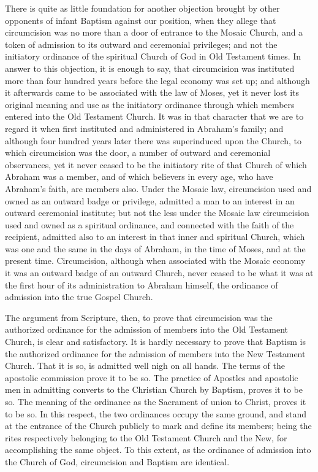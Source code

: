 \documentclass[]{book}
\begin{document}
There is quite as little foundation for another objection brought by other opponents of infant Baptism against our position, when they allege that circumcision was no more than a door of entrance to the Mosaic Church, and a token of admission to its outward and ceremonial privileges; and not the initiatory ordinance of the spiritual Church of God in Old Testament times. In answer to this objection, it is enough to say, that circumcision was instituted more than four hundred years before the legal economy was set up; and although it afterwards came to be associated with the law of Moses, yet it never lost its original meaning and use as the initiatory ordinance through which members entered into the Old Testament Church. It was in that character that we are to regard it when first instituted and administered in Abraham's family; and although four hundred years later there was superinduced upon the Church, to which circumcision was the door, a number of outward and ceremonial observances, yet it never ceased to be the initiatory rite of that Church of which Abraham was a member, and of which believers in every age, who have Abraham's faith, are members also. Under the Mosaic law, circumcision used and owned as an outward badge or privilege, admitted a man to an interest in an outward ceremonial institute; but not the less under the Mosaic law circumcision used and owned as a spiritual ordinance, and connected with the faith of the recipient, admitted also to an interest in that inner and spiritual Church, which was one and the same in the days of Abraham, in the time of Moses, and at the present time. Circumcision, although when associated with the Mosaic economy it was an outward badge of an outward Church, never ceased to be what it was at the first hour of its administration to Abraham himself, the ordinance of admission into the true Gospel Church.

The argument from Scripture, then, to prove that circumcision was the authorized ordinance for the admission of members into the Old Testament Church, is clear and satisfactory. It is hardly necessary to prove that Baptism is the authorized ordinance for the admission of members into the New Testament Church. That it is so, is admitted well nigh on all hands. The terms of the apostolic commission prove it to be so. The practice of Apostles and apostolic men in admitting converts to the Christian Church by Baptism, proves it to be so. The meaning of the ordinance as the Sacrament of union to Christ, proves it to be so. In this respect, the two ordinances occupy the same ground, and stand at the entrance of the Church publicly to mark and define its members; being the rites respectively belonging to the Old Testament Church and the New, for accomplishing the same object. To this extent, as the ordinance of admission into the Church of God, circumcision and Baptism are identical.
\end{document}
